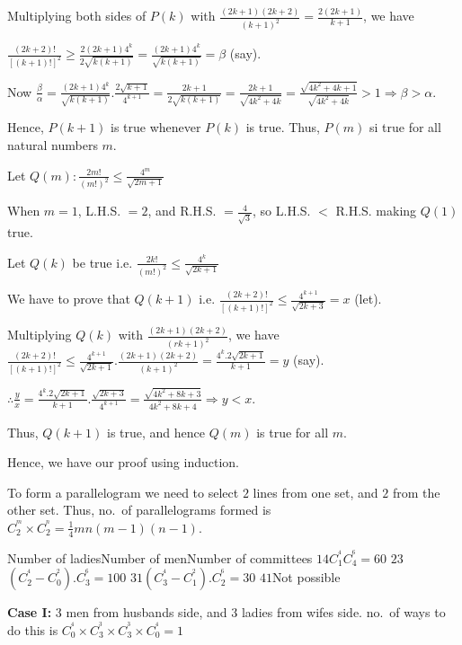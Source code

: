   Multiplying both sides of $P(k)$ with $\frac{(2k + 1)(2k + 2)}{(k + 1)^2} = \frac{2(2k + 1)}{k + 1}$, we
  have

  $\frac{(2k + 2)!}{[(k + 1)!]^2}\geq \frac{2(2k + 1)4^k}{2\sqrt{k(k + 1)}} = \frac{(2k + 1)4^k}{\sqrt{k(k +
      1)}} = \beta$ (say).

  Now $\frac{\beta}{\alpha} = \frac{(2k + 1)4^k}{\sqrt{k(k + 1)}}.\frac{2\sqrt{k + 1}}{4^{k + 1}} = \frac{2k
  + 1}{2\sqrt{k(k + 1)}} = \frac{2k + 1}{\sqrt{4k^2 + 4k}} = \frac{\sqrt{4k^2 + 4k + 1}}{\sqrt{4k^2 + 4k}} >
  1 \Rightarrow \beta > \alpha$.

  Hence, $P(k + 1)$ is true whenever $P(k)$ is true. Thus, $P(m)$ si true for all natural numbers $m$.

  Let $Q(m): \frac{2m!}{(m!)^2}\leq \frac{4^m}{\sqrt{2m + 1}}$

  When $m = 1$, L.H.S. $= 2$, and R.H.S. $= \frac{4}{\sqrt{3}}$, so L.H.S. $<$ R.H.S. making $Q(1)$ true.

  Let $Q(k)$ be true i.e. $\frac{2k!}{(m!)^2}\leq \frac{4^k}{\sqrt{2k + 1}}$

  We have to prove that $Q(k + 1)$ i.e. $\frac{(2k + 2)!}{[(k + 1)!]^2}\leq\frac{4^{k + 1}}{\sqrt{2k + 3}} =
  x$ (let).

  Multiplying $Q(k)$ with $\frac{(2k + 1)(2k + 2)}{(rk + 1)^2}$, we have $\frac{(2k + 2)!}{[(k + 1)!]^2}\leq
  \frac{4^{k + 1}}{\sqrt{2k + 1}}.\frac{(2k + 1)(2k + 2)}{(k + 1)^2} = \frac{4^k.2\sqrt{2k + 1}}{k + 1} = y$
  (say).

  $\therefore \frac{y}{x} = \frac{4^k.2\sqrt{2k + 1}}{k + 1}.\frac{\sqrt{2k + 3}}{4^{k + 1}} =
  \frac{\sqrt{4k^2 + 8k + 3}}{4k^2 + 8k + 4}\Rightarrow y < x$.

  Thus, $Q(k + 1)$ is true, and hence $Q(m)$ is true for all $m$.

  Hence, we have our proof using induction.
\item To form a parallelogram we need to select $2$ lines from one set, and $2$ from the other set. Thus,
  no.\ of parallelograms formed is $C_2^^m\times C_2^^n = \frac{1}{4}mn(m - 1)(n - 1)$.
\item \starttabulate[|c|c|l|]
  \NC Number of ladies\NC Number of men\NC Number of committees\NC\NR
  \NC $1$\NC $4$\NC $C_1^^4C_4^^6 = 60$\NC\NR
  \NC $2$\NC $3$\NC $(C_2^^4 - C_0^^2).C_3^^6 = 100$\NC\NR
  \NC $3$\NC $1$\NC $(C_3^^4 - C_1^^2).C_2^^6 = 30$\NC\NR
  \NC $4$\NC $1$\NC Not possible\NC\NR
\stoptabulate
\item {\bf Case I:} $3$ men from husband\symbol[rightquote]s side, and $3$ ladies from wife\symbol[rightquote]s side. no.\ of ways to do this is
  $C_0^^4\times C_3^^3\times C_3^^3\times C_0^^4 = 1$

